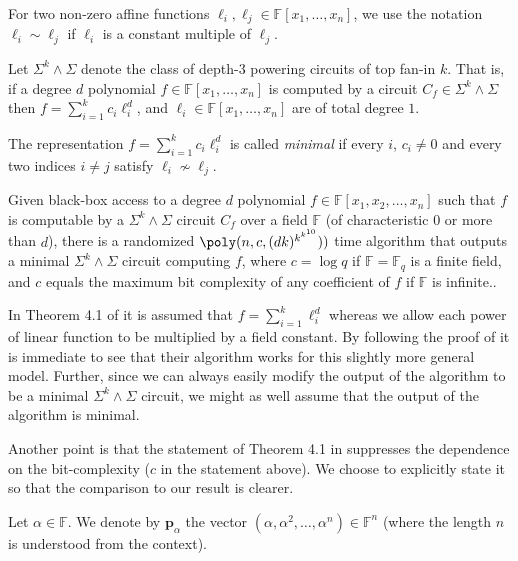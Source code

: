 \documentclass[12pt]{article}
\newcommand{\F}{\mathbb{F}}
\newcommand{\SumPowSumk}{\Sigma^k \!\wedge\! \Sigma}
\renewcommand{\vec}[1]{{\mathbf{#1}}}
\newcommand{\Moments}{\vec{p}}
\begin{document}
	
	For two non-zero affine functions $\ell_i, \ell_j \in \F[x_1, \ldots, x_n]$, we use the notation $\ell_i \sim \ell_j$ if $\ell_i$ is a constant multiple of $\ell_j$.
	
	\begin{definition}
		Let $\SumPowSumk$ denote the class of depth-$3$ powering circuits of top fan-in $k$. That is, if a degree $d$ polynomial $ f\in \F[x_1,\ldots, x_n]$ is computed by a circuit $C_f \in \SumPowSumk$ then $f=\sum_{i=1}^k c_i \ell_i^{d}$, and $\ell_i\in \F[x_1,\ldots, x_n]$ are of total degree $1$.
		
		The representation $f=\sum_{i=1}^k c_i \ell_i^{d}$ is called \emph{minimal} if every $i$, $c_i\neq 0$ and every two indices $i\neq j$ satisfy $\ell_i\not\sim \ell_j$. 
	\end{definition}
	
	
	\begin{theorem}
		\label{thm:BSV-sumpowsumk}
		Given black-box access to a degree $d$ polynomial $f \in \F[x_1, x_2,\ldots , x_n]$ such that $f$ is computable by a $\SumPowSumk$ circuit $C_f$ over a field $\F$ (of characteristic $0$ or more than $ d$), there is a randomized $\poly(n,c, (dk)^{k^{k^{10}}}))$
		time algorithm that outputs a minimal $\SumPowSumk$ circuit computing $f$, where $c=\log q$ if $\F=\F_q$ is a finite field, and $c$ equals the maximum bit complexity of any coefficient of $f$ if $\F$ is infinite..
	\end{theorem}
	
	\begin{remark}
		In Theorem 4.1 of \cite{BSV21} it is assumed that $f = \sum_{i=1}^k \ell_i ^d$ whereas we allow each power of linear function to be multiplied by a field constant. By following the proof of \cite{BSV21} it is immediate to see that their algorithm works for this slightly more general model. Further, since we can always easily modify the output of the algorithm to be a minimal $\SumPowSumk$ circuit, we might as well assume that the output of the algorithm is minimal.
		
		Another point is that the statement of Theorem 4.1 in \cite{BSV21} suppresses the dependence on the bit-complexity ($c$ in the statement above). We choose to explicitly state it so that the comparison to our result is clearer.
	\end{remark}
	
	
	\begin{definition}
		Let $\alpha \in \F$. We denote by $\Moments_\alpha$ the vector $(\alpha, \alpha^2, \ldots, \alpha^{n}) \in \F^n$ (where the length $n$ is understood from the context).
	\end{definition}
	
\end{document}
